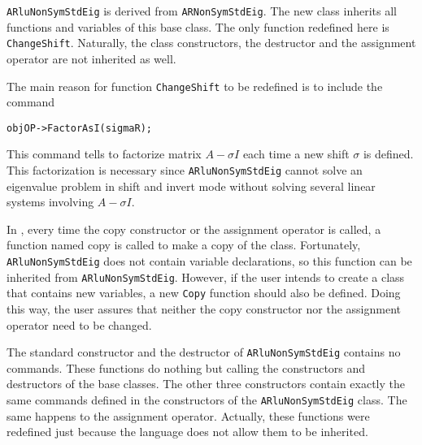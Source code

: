 \texttt{ARluNonSymStdEig} is derived from \texttt{ARNonSymStdEig}. The new class inherits all functions and variables of this base class. The only function redefined here is \texttt{ChangeShift}. Naturally, the class constructors, the destructor and the assignment operator are not inherited as well.

The main reason for function \texttt{ChangeShift} to be redefined is to include the command
\begin{verbatim}
objOP->FactorAsI(sigmaR);
\end{verbatim}
This command tells \ARPP{} to factorize matrix $A-\sigma I$ each time a new shift $\sigma$ is defined. This factorization is necessary since \texttt{ARluNonSymStdEig} cannot solve an eigenvalue problem in shift and invert mode without solving several linear systems involving $A-\sigma I$.

In \ARPP{}, every time the copy constructor or the assignment operator is called, a function named copy is called to make a copy of the class. Fortunately, \texttt{ARluNonSymStdEig} does not contain variable declarations, so this function can be inherited from \texttt{ARluNonSymStdEig}. However, if the user intends to create a class that contains new variables, a new \texttt{Copy} function should also be defined. Doing this way, the user assures that neither the copy constructor nor the assignment operator need to be changed.

The standard constructor and the destructor of \texttt{ARluNonSymStdEig} contains no commands. These functions do nothing but calling the constructors and destructors of the base classes. The other three constructors contain exactly the same commands defined in the constructors of the \texttt{ARluNonSymStdEig} class. The same happens to the assignment operator. Actually, these functions were redefined just because the language does not allow them to be inherited.
